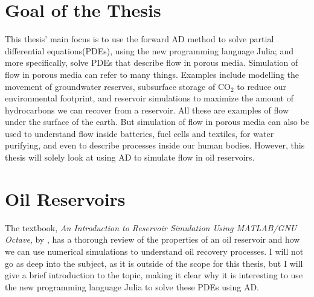 \section{Goal of the Thesis}
This thesis' main focus is to use the forward AD method to solve partial differential equations(PDEs), using the new programming language Julia; and more specifically, solve PDEs that describe flow in porous media. Simulation of flow in porous media can refer to many things. Examples include modelling the movement of groundwater reserves, subsurface storage of CO$_2$ to reduce our environmental footprint, and reservoir simulations to maximize the amount of hydrocarbons we can recover from a reservoir. All these are examples of flow under the surface of the earth. But simulation of flow in porous media can also be used to understand flow inside batteries, fuel cells and textiles, for water purifying, and even to describe processes inside our human bodies. However, this thesis will solely look at using AD to simulate flow in oil reservoirs.

\section{Oil Reservoirs}
The textbook, \textit{An Introduction to Reservoir Simulation Using MATLAB/GNU Octave}, by \emph{\citet{lieMrstUrl}}, has a thorough review of the properties of an oil reservoir and how we can use numerical simulations to understand oil recovery processes. I will not go as deep into the subject, as it is outside of the scope for this thesis, but I will give a brief introduction to the topic, making it clear why it is interesting to use the new programming language Julia to solve these PDEs using AD.

